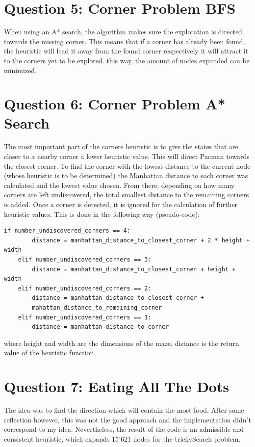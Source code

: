 \documentclass[onecolumn]{article}
\begin{document}
	\section{Question 5: Corner Problem BFS}
	When using an A* search, the algorithm makes sure the exploration is directed towards the missing corner. This means that if a corner has already been found, the heuristic will lead it away from the found corner respectively it will attract it to the corners yet to be explored. this way, the amount of nodes expanded can be minimized.
	
	\newpage
	\vspace*{80px}

	\section{Question 6: Corner Problem A* Search}	
	The most important part of the corners heuristic is to give the states that are closer to a nearby corner a lower heuristic value. This will direct Pacman towards the closest corner. To find the corner with the lowest distance to the current node (whose heuristic is to be determined) the Manhattan distance to each corner was calculated and the lowest value chosen. From there, depending on how many corners are left undiscovered, the total smallest distance to the remaining corners is added.
	Once a corner is detected, it is ignored for the calculation of further heuristic values. This is done in the following way (pseudo-code):
	
	\begin{lstlisting}[style=Python]
	if number_undiscovered_corners == 4:
		distance = manhattan_distance_to_closest_corner + 2 * height + width
	elif number_undiscovered_corners == 3:
		distance = manhattan_distance_to_closest_corner + height + width
	elif number_undiscovered_corners == 2:
		distance = manhattan_distance_to_closest_corner +
		mahattan_distance_to_remaining_corner
	elif number_undiscovered_corners == 1:
		distance = manhattan_distance_to_corner
	\end{lstlisting}
	
	where height and width are the dimensions of the maze, distance is the return value of the heuristic function.

	
	\section{Question 7: Eating All The Dots}
	The idea was to find the direction which will contain the most food. After some reflection however, this was not the good approach and the implementation didn't correspond to my idea. Nevertheless, the result of the code is an admissible and consistent heuristic, which expands 15'621 nodes for the trickySearch problem. 
\end{document}
